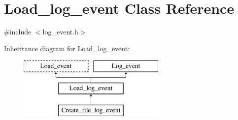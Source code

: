 \hypertarget{classLoad__log__event}{}\section{Load\+\_\+log\+\_\+event Class Reference}
\label{classLoad__log__event}


{\ttfamily \#include $<$log\+\_\+event.\+h$>$}

Inheritance diagram for Load\+\_\+log\+\_\+event\+:\begin{figure}[H]
\begin{center}
\leavevmode
\includegraphics[height=3.000000cm]{classLoad__log__event}
\end{center}
\end{figure}
